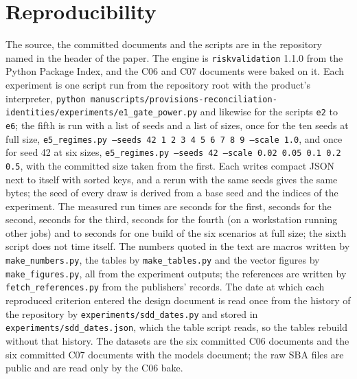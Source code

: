 \section{Reproducibility}
\label{sec:reproducibility}

The source, the committed documents and the scripts are in the repository named in the header of the paper.
The engine is \texttt{riskvalidation} 1.1.0 from the Python Package Index, and the C06 and C07 documents were baked on it.
Each experiment is one script run from the repository root with the product's interpreter, \texttt{python manuscripts/provisions-reconciliation-identities/experiments/e1\_gate\_power.py} and likewise for the scripts \texttt{e2} to \texttt{e6}; the fifth is run with a list of seeds and a list of sizes, once for the ten seeds at full size, \texttt{e5\_regimes.py --seeds 42 1 2 3 4 5 6 7 8 9 --scale 1.0}, and once for seed 42 at six sizes, \texttt{e5\_regimes.py --seeds 42 --scale 0.02 0.05 0.1 0.2 0.5}, with the committed size taken from the first.
Each writes compact JSON next to itself with sorted keys, and a rerun with the same seeds gives the same bytes; the seed of every draw is derived from a base seed and the indices of the experiment.
The measured run times are \eoneSeconds{} seconds for the first, \etwoSeconds{} seconds for the second, \ethreeSeconds{} seconds for the third, \efourSeconds{} seconds for the fourth (on a workstation running other jobs) and \efiveSecLow{} to \efiveSecHigh{} seconds for one build of the six scenarios at full size; the sixth script does not time itself.
The numbers quoted in the text are macros written by \texttt{make\_numbers.py}, the tables by \texttt{make\_tables.py} and the vector figures by \texttt{make\_figures.py}, all from the experiment outputs; the references are written by \texttt{fetch\_references.py} from the publishers' records. The date at which each reproduced criterion entered the design document is read once from the history of the repository by \texttt{experiments/sdd\_dates.py} and stored in \texttt{experiments/sdd\_dates.json}, which the table script reads, so the tables rebuild without that history.
The datasets are the six committed C06 documents and the six committed C07 documents with the models document; the raw SBA files are public and are read only by the C06 bake.
